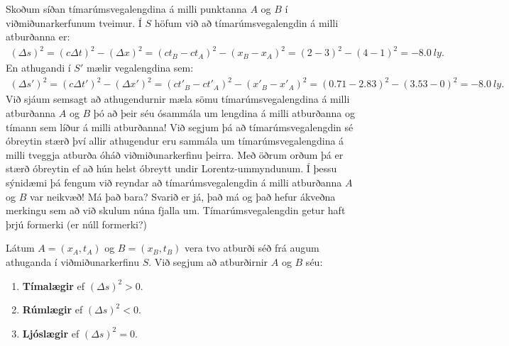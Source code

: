 Skoðum síðan tímarúmsvegalengdina á milli punktanna $A$ og $B$ í viðmiðunarkerfunum tveimur. Í $S$ höfum við að tímarúmsvegalengdin á milli atburðanna er:
\begin{align*}
    (\Delta s)^2 = (c\Delta t)^2 - (\Delta x)^2 = (ct_B - ct_A)^2 - (x_B - x_A)^2 = (2-3)^2 - (4-1)^2 =  -\SI{8.0}{ly}.
\end{align*}
En athugandi í $S'$ mælir vegalengdina sem:
\begin{align*}
    (\Delta s')^2 = (c\Delta t')^2 - (\Delta x')^2 = (ct'_B - ct'_A)^2 - (x'_B - x'_A)^2 = (0.71-2.83)^2 - (3.53-0)^2 = -\SI{8.0}{ly}.
\end{align*}
Við sjáum semsagt að athugendurnir mæla sömu tímarúmsvegalengdina á milli atburðanna $A$ og $B$ þó að þeir séu ósammála um lengdina á milli atburðanna og tímann sem líður á milli atburðanna! Við segjum þá að tímarúmsvegalengdin sé óbreytin stærð því allir athugendur eru sammála um tímarúmsvegalengdina á milli tveggja atburða óháð viðmiðunarkerfinu þeirra. Með öðrum orðum þá er stærð óbreytin ef að hún helst óbreytt undir Lorentz-ummyndunum. Í þessu sýnidæmi þá fengum við reyndar að tímarúmsvegalengdin á milli atburðanna $A$ og $B$ var neikvæð! Má það bara? Svarið er já, það má og það hefur ákveðna merkingu sem að við skulum núna fjalla um. Tímarúmsvegalengdin getur haft þrjú formerki (er núll formerki?)

\begin{tcolorbox}
\begin{definition}
Látum $A = (x_A, t_A)$ og $B = (x_B, t_B)$ vera tvo atburði séð frá augum athuganda í viðmiðunarkerfinu $S$. Við segjum að atburðirnir $A$ og $B$ séu:
\begin{enumerate}[label = \textbf{(\roman*)}]
    \item \textbf{Tímalægir} ef $(\Delta s)^2 > 0$.
    \item \textbf{Rúmlægir} ef $(\Delta s)^2 < 0$.
    \item \textbf{Ljóslægir} ef $(\Delta s)^2 = 0$.
\end{enumerate}
\end{definition}
\end{tcolorbox}

